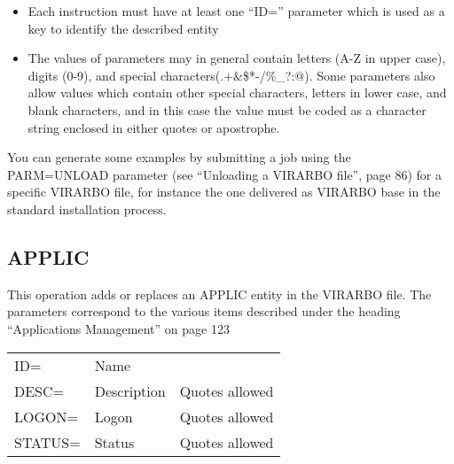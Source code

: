 \documentclass[letterpaper,10pt,english]{sphinxmanual}
\begin{document}
\begin{itemize}
\item {} 
Each instruction must have at least one “ID=” parameter which is used as a key to identify the described entity

\item {} 
The values of parameters may in general contain letters (A-Z in upper case), digits (0-9), and special characters(.+\&\$*-/\%\_?:@). Some parameters also allow values which contain other special characters, letters in lower case, and blank characters, and in this case the value must be coded as a character string enclosed in either quotes or apostrophe.

\end{itemize}

You can generate some examples by submitting a job using the PARM=UNLOAD parameter (see “Unloading a VIRARBO file”, page 86) for a specific VIRARBO file, for instance the one delivered as VIRARBO base in the standard installation process.


\subsection{APPLIC}
\label{\detokenize{Installation_Guide:applic}}\label{\detokenize{Installation_Guide:index-26}}
This operation adds or replaces an APPLIC entity in the VIRARBO file. The parameters correspond to the various items
described under the heading “Applications Management” on page 123


\begin{savenotes}\sphinxattablestart
\centering
\begin{tabulary}{\linewidth}[t]{|T|T|T|}
\hline
{}\relax &\relax &\relax \\
\hline
ID=
&
Name
&\\
\hline
DESC=
&
Description
&
Quotes allowed
\\
\hline
LOGON=
&
Logon
&
Quotes allowed
\\
\hline
STATUS=
&
Status
&
Quotes allowed
\\
\hline
\end{tabulary}
\par
\sphinxattableend\end{savenotes}
\end{document}
